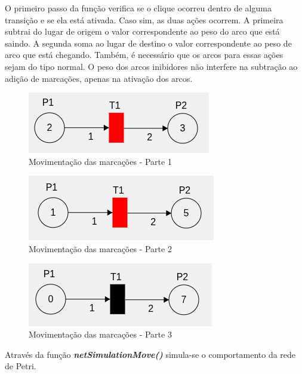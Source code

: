 \documentclass[
	12pt,				%
	openright,			%
	oneside,			%
	a4paper,			%
	english,			%
	brazil				%
	]{abntex2}
\begin{document}
O primeiro passo da função verifica se o clique ocorreu dentro de alguma transição e se ela está ativada. Caso sim, as duas ações ocorrem. A primeira subtrai do lugar de origem o valor correspondente ao peso do arco que está saindo. A segunda soma ao lugar de destino o valor correspondente ao peso de arco que está chegando. Também, é necessário que os arcos para essas ações sejam do tipo normal. O peso dos arcos inibidores não interfere na subtração ao adição de marcações, apenas na ativação dos arcos.

\begin{figure}[ht] 
	\centering
	\includegraphics[scale=0.8]{figuras/moveTokens1.png}
	\caption[Movimentando as marcações - Parte 1]{Movimentação das marcações - Parte 1}
	\label{fig:moveTokens1}
\end{figure}
\FloatBarrier

\begin{figure}[ht] 
	\centering
	\includegraphics[scale=0.8]{figuras/moveTokens2.png}
	\caption[Movimentando as marcações - Parte 2]{Movimentação das marcações - Parte 2}
	\label{fig:moveTokens2}
\end{figure}
\FloatBarrier

\begin{figure}[ht] 
	\centering
	\includegraphics[scale=0.8]{figuras/moveTokens3.png}
	\caption[Movimentando as marcações - Parte 3]{Movimentação das marcações - Parte 3}
	\label{fig:moveTokens3}
\end{figure}
\FloatBarrier

Através da função \textbf{\textit{netSimulationMove()}} simula-se o comportamento da rede de Petri.
\end{document}

